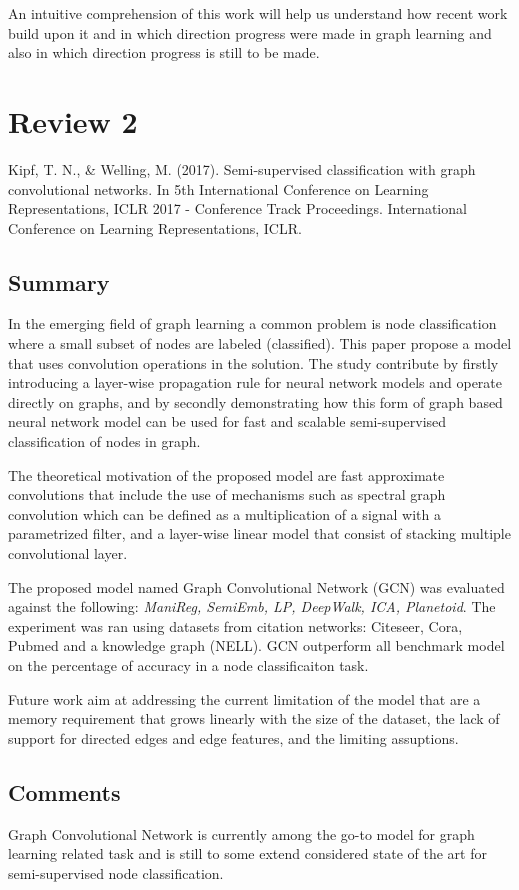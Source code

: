 \documentclass{article}
\begin{document}
An intuitive comprehension of this work will help us understand how recent 
work build upon it and in which direction progress were made in graph 
learning and also in which direction progress is still to be made.



\section*{Review 2}
Kipf, T. N., \& Welling, M. (2017). Semi-supervised classification with 
graph convolutional networks. In 5th International Conference on Learning 
Representations, ICLR 2017 - Conference Track Proceedings. International 
Conference on Learning Representations, ICLR.


\subsection*{Summary}
In the emerging field of graph learning a common problem is node 
classification where a small subset of nodes are labeled (classified). 
This paper propose a model that uses convolution operations in the solution.
The study contribute by firstly introducing a layer-wise propagation rule 
for neural network models and operate directly on graphs, and by secondly 
demonstrating how this form of graph based neural network model can be 
used for fast and scalable semi-supervised classification of nodes in graph.

The theoretical motivation of the proposed model are fast approximate 
convolutions that include the use of mechanisms such as spectral graph 
convolution which can be defined as a multiplication of a signal with a 
parametrized filter, and a layer-wise linear model that consist of stacking
multiple convolutional layer.

The proposed model named Graph Convolutional Network (GCN) was evaluated 
against the following: \textit{ManiReg, SemiEmb, LP, DeepWalk, ICA, Planetoid}. 
The experiment was ran using datasets from citation networks: Citeseer, 
Cora, Pubmed and a knowledge graph (NELL). GCN outperform all benchmark 
model on the percentage of accuracy in a node classificaiton task.

Future work aim at addressing the current limitation of the model that are 
a memory requirement that grows linearly with the size of the dataset, 
the lack of support for directed edges and edge features, and the limiting
assuptions.


\subsection*{Comments}
Graph Convolutional Network is currently among the go-to model for graph 
learning related task and is still to some extend considered state of the 
art for semi-supervised node classification. 
\end{document}
